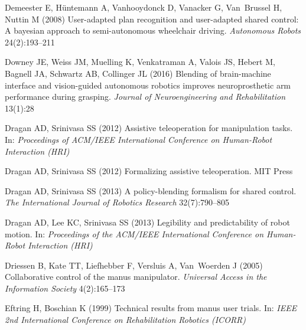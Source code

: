 \documentclass[natbib, twocolumn]{svjour3}          %
\begin{document}
\begin{thebibliography}{54}
	Demeester E, H{\"u}ntemann A, Vanhooydonck D, Vanacker G, Van~Brussel H, Nuttin
	M (2008) User-adapted plan recognition and user-adapted shared control: A
	bayesian approach to semi-autonomous wheelchair driving. \textit{Autonomous
		Robots} 24(2):193--211
	
	Downey JE, Weiss JM, Muelling K, Venkatraman A, Valois JS, Hebert M, Bagnell
	JA, Schwartz AB, Collinger JL (2016) Blending of brain-machine interface and
	vision-guided autonomous robotics improves neuroprosthetic arm performance
	during grasping. \textit{Journal of Neuroengineering and Rehabilitation}
	13(1):28
	
	Dragan AD, Srinivasa SS (2012{}) Assistive teleoperation for
	manipulation tasks. In: \textit{Proceedings of ACM/IEEE International
		Conference on Human-Robot Interaction (HRI)}
	
	Dragan AD, Srinivasa SS (2012{}) Formalizing assistive
	teleoperation. MIT Press
	
	Dragan AD, Srinivasa SS (2013) A policy-blending formalism for shared control.
	\textit{The International Journal of Robotics Research} 32(7):790--805
	
	Dragan AD, Lee KC, Srinivasa SS (2013) Legibility and predictability of robot
	motion. In: \textit{Proceedings of the ACM/IEEE International Conference on
		Human-Robot Interaction (HRI)}
	
	Driessen B, Kate TT, Liefhebber F, Versluis A, Van~Woerden J (2005)
	Collaborative control of the manus manipulator. \textit{Universal Access in
		the Information Society} 4(2):165--173
	
	Eftring H, Boschian K (1999) Technical results from manus user trials. In:
	\textit{IEEE 2nd International Conference on Rehabilitation Robotics (ICORR)}
	

\end{thebibliography}
\end{document}
